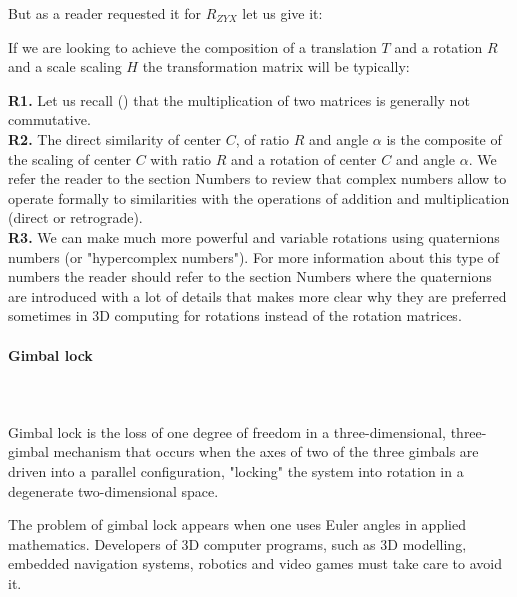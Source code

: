 	But as a reader requested it for $R_{ZYX}$ let us give it:
	
	
	If we are looking to achieve the composition of a translation $T$ and a rotation $R$ and a scale scaling $H$ the transformation matrix will be typically:
	
	\begin{tcolorbox}[title=Remarks,colframe=black,arc=10pt]
	\textbf{R1.} Let us recall () that the multiplication of two matrices is generally not commutative.\\
	
	\textbf{R2.} The direct similarity of center $C$, of ratio $R$ and angle $\alpha$ is the composite of the scaling of center $C$ with ratio $R$ and a rotation of center $C$ and angle $\alpha$. We refer the reader to the section Numbers to review that complex numbers allow to operate formally to similarities with the operations of addition and multiplication (direct or retrograde).\\
	
	\textbf{R3.} We can make much more powerful and variable rotations using quaternions numbers (or "hypercomplex numbers"). For more information about this type of numbers the reader should refer to the section Numbers where the quaternions are introduced with a lot of details that makes more clear why they are preferred sometimes in 3D computing for rotations instead of the rotation matrices.
	\end{tcolorbox}
	
	\paragraph{Gimbal lock}\mbox{}\\\\
	Gimbal lock is the loss of one degree of freedom in a three-dimensional, three-gimbal mechanism that occurs when the axes of two of the three gimbals are driven into a parallel configuration, "locking" the system into rotation in a degenerate two-dimensional space.
	
	The problem of gimbal lock appears when one uses Euler angles in applied mathematics. Developers of 3D computer programs, such as 3D modelling, embedded navigation systems, robotics and video games must take care to avoid it.
	

